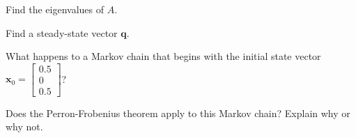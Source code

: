 \documentclass[12pt]{article}
\newcommand{\vs}[1]{\vspace{#1in}}
\newcommand{\qvec}{{\mathbf q}}
\newcommand{\xvec}{{\mathbf x}}
\newcommand{\threevec}[3]{\left[\begin{array}{r}#1 \\ #2 \\ #3
  \end{array}\right]}
\begin{document}
\begin{enumerate}
  Find the eigenvalues of $A$.

  \vs{1}
  \newpage
  Find a steady-state vector $\qvec$.

  \vs{1}
  What happens to a Markov chain that begins with the initial state
  vector $\xvec_0 =\threevec{0.5}0{0.5}$?  

  \vs{1}
  Does the Perron-Frobenius theorem apply to this Markov chain?
  Explain why or why not.

  
  



\end{enumerate}
\end{document}
